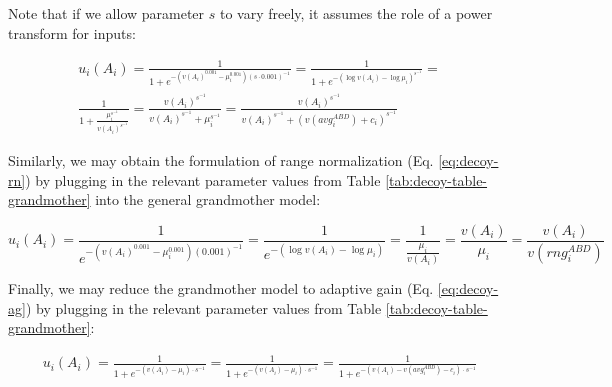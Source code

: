 \documentclass[a4paper, nobind]{templates/ociamthesis}
\begin{document}
Note that if we allow parameter \(s\) to vary freely, it assumes the role of a power transform for inputs:

\begin{equation}
\begin{aligned}
u_i(A_i) = \frac{1}{1+e^{-(v(A_i)^{0.001}-\mu_i^{0.001})(s \cdot 0.001)^{-1}}} = \frac{1}{1+e^{-(\log{v(A_i)}-\log{\mu_i})^{s^{-1}}}} = \\ \frac{1}{1+\frac{\mu_i^{s^{-1}}}{v(A_i)^{s^{-1}}}} =  {\frac{v(A_i)^{s^{-1}}}{v(A_i)^{s^{-1}}+\mu_i^{s^{-1}}}} = {\frac{v(A_i)^{s^{-1}}}{v(A_i)^{s^{-1}}+(v(avg^{ABD}_i)+c_i)^{s^{-1}}}}
\label{eq:decoy-power-eq}
\end{aligned}
\end{equation}

Similarly, we may obtain the formulation of range normalization (Eq. \eqref{eq:decoy-rn}) by plugging in the relevant parameter values from Table \ref{tab:decoy-table-grandmother} into the general grandmother model:

\begin{equation}
u_i(A_i) = \frac{1}{e^{-(v(A_i)^{0.001}-\mu^{0.001}_i)(0.001)^{-1}}} = \frac{1}{e^{-(\log{v(A_i)}-\log{\mu_i})}} = \frac{1}{\frac{\mu_i}{v(A_i)}} = {\frac{v(A_i)}{\mu_i}} = {\frac{v(A_i)}{v(rng^{ABD}_i)}}
\end{equation}

Finally, we may reduce the grandmother model to adaptive gain (Eq. \eqref{eq:decoy-ag}) by plugging in the relevant parameter values from Table \ref{tab:decoy-table-grandmother}:

\begin{equation}
\begin{aligned}
u_i(A_i) = \frac{1}{1+e^{-(v(A_i)-\mu_i) \cdot s^{-1}}} = \frac{1}{1+e^{-({v(A_i)}-{\mu_i}) \cdot s^{-1}}} = \frac{1}{1+e^{-({v(A_i)}-v(avg^{ABD}_i)-c_i)\cdot s^{-1}}}
\end{aligned}
\end{equation}
\end{document}
